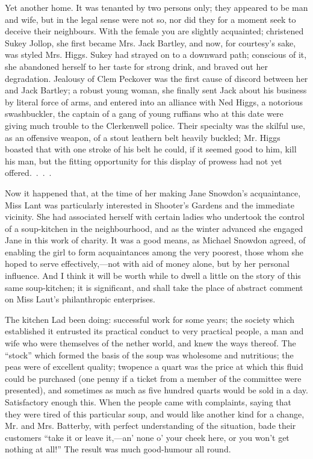 Yet another home. It was tenanted by two persons only; they appeared to
be man and wife, but in the legal sense were not so, nor did they for a
moment seek to deceive their neighbours. With the female you are
slightly acquainted; christened Sukey Jollop, she first became Mrs. Jack
Bartley, and now, for courtesy's sake, was styled Mrs. Higgs. Sukey had
strayed on to a downward path; conscious of it, she abandoned herself to
her taste for strong drink, and braved out her degradation. Jealousy of
Clem Peckover was the first cause of discord between her and Jack
Bartley; a robust young woman, she finally sent Jack about his business
by literal force of arms, and entered into an alliance with Ned Higgs, a
notorious swashbuckler, the captain of a gang of young ruffians who at
this date were giving much trouble to the Clerkenwell police. Their
specialty was the skilful use, as an offensive weapon, of a stout
leathern belt heavily buckled; Mr. Higgs boasted that with one stroke of
his belt he could, if it seemed good {\protect\hypertarget{8}{}{}}to
him, kill his man, but the fitting opportunity for this display of
prowess had not yet offered{.~.~.~.}

Now it happened that, at the time of her making Jane Snowdon's
acquaintance, Miss Lant was particularly interested in Shooter's Gardens
and the immediate vicinity. She had associated herself with certain
ladies who undertook the control of a soup-kitchen in the neighbourhood,
and as the winter advanced she engaged Jane in this work of charity. It
was a good means, as Michael Snowdon agreed, of enabling the girl to
form acquaintances among the very poorest, those whom she hoped to serve
effectively,---not with aid of money alone, but by her personal
influence. And I think it will be worth while to dwell a little on the
story of this same soup-kitchen; it is significant, and shall take the
place of abstract comment on Miss Laut's philanthropic enterprises.

The kitchen Lad been doing: successful work for some years; the society
which established it entrusted its practical conduct to very practical
people, a man and wife who were themselves of the nether world, and knew
the ways {\protect\hypertarget{9}{}{}}thereof. The ``stock'' which
formed the basis of the soup was wholesome and nutritious; the peas were
of excellent quality; twopence a quart was the price at which this fluid
could be purchased (one penny if a ticket from a member of the committee
were presented), and sometimes as much as five hundred quarts would be
sold in a day. Satisfactory enough this. When the people came with
complaints, saying that they were tired of this particular soup, and
would like another kind for a change, Mr. and Mrs. Batterby, with
perfect understanding of the situation, bade their customers ``take it
or leave it,---an' none o' your cheek here, or you won't get nothing at
all!'' The result was much good-humour all round.

